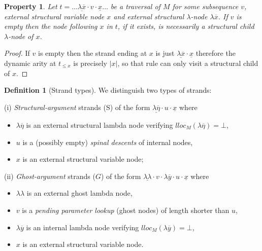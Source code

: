 \documentclass{elsarticle}
\makeatletter
\theoremstyle{plain}
\newtheorem{property}[theorem]{Property}
\theoremstyle{definition}
\newtheorem{definition}{Definition}[section]
\newcommand{\ghostlmd}{{\lambda\!\!\lambda}}
\renewcommand\ie{{\it i.e.\@\xspace}}
\makeatother
\begin{document}
\begin{property}
\label{prop:strand_spinaldescent}
Let $t= \ldots \underline{\lambda \overline{x}} \cdot v \cdot \underline{x} \ldots$
be a traversal of $M$
for some subsequence $v$,
 external structural variable node $x$
 and external structural $\lambda$-node $\lambda \overline{x}$.
If $v$ is empty then the node following $x$ in $t$, if it exists, is necessarily a structural child $\lambda$-node of $x$.
\end{property}
\begin{proof}
 If $v$ is empty then the strand ending at $x$
 is just $\underline{\lambda \overline{x}} \cdot \underline{x}$ therefore
 the dynamic arity at $t_{\leq x}$ is precisely $|x|$, so that rule  can only visit a structural child of $x$.
\end{proof}

\begin{definition}[Strand types]
    \label{def:strandtypes}
    We distinguish two types of strands:

      \noindent (i) \emph{Structural-argument} strands (S) of the form $\underline{\lambda\overline{\eta}} \cdot u \cdot \underline{x}$
            where
            \begin{itemize}[nosep]
            \item $\lambda\overline{\eta}$ is an external structural lambda node verifying $lloc_M(\lambda\overline\eta) = \bot$,
            \item $u$ is a (possibly empty) \emph{spinal descents} of internal nodes,
            \item $x$ is an external structural variable node;
            \end{itemize}

        \item
        (ii) \emph{Ghost-argument} strands ($G$) of the form $\underline{\ghostlmd} \cdot  v \cdot \lambda\overline{y} \cdot u \cdot \underline{x}$
        where
        \begin{itemize}[nosep]
            \item $\ghostlmd$ is an external ghost lambda node,
            \item $v$ is a \emph{pending parameter lookup} (ghost nodes) of length shorter than $u$,
            \item $\lambda\overline{y}$ is an internal lambda node verifying $lloc_M(\lambda\overline{y}) = \bot$,
            \item $x$ is an external structural variable node.
        \end{itemize}
\end{definition}
\end{document}
